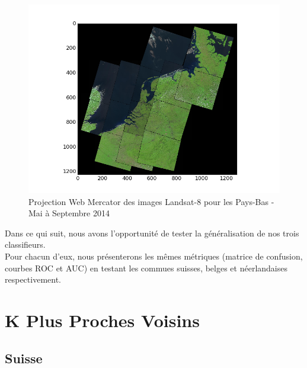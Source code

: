 \documentclass{book}
\begin{document}
 \begin{figure}[H]
 \begin{center}
 \includegraphics[scale=0.60]{../../data/Pays-Bas/covering-selection.png}
 \caption{Projection Web Mercator des images Landsat-8 pour les Pays-Bas - Mai à Septembre 2014}
\label{pays-bas_landsat}
\end{center}
\end{figure}

Dans ce qui suit, nous avons l'opportunité de tester la généralisation de nos trois classifieurs.\\
Pour chacun d'eux, nous présenterons les mêmes métriques (matrice de confusion, courbes ROC et AUC) en testant les commues suisses, belges et néerlandaises respectivement.

\section{K Plus Proches Voisins}

\subsection{Suisse}
\end{document}
